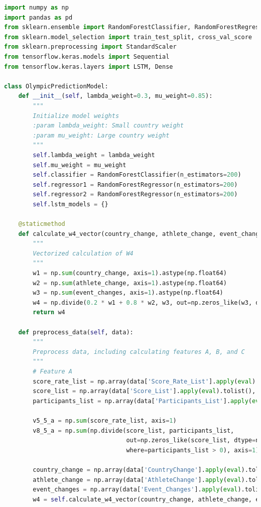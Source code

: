 \documentclass[12pt]{article}
\begin{document}
\begin{lstlisting}[language=Python, style=mystyle, caption=model.ipynb]
import numpy as np
import pandas as pd
from sklearn.ensemble import RandomForestClassifier, RandomForestRegressor
from sklearn.model_selection import train_test_split, cross_val_score
from sklearn.preprocessing import StandardScaler
from tensorflow.keras.models import Sequential
from tensorflow.keras.layers import LSTM, Dense

class OlympicPredictionModel:
    def __init__(self, lambda_weight=0.3, mu_weight=0.85):
        """
        Initialize model weights
        :param lambda_weight: Small country weight
        :param mu_weight: Large country weight
        """
        self.lambda_weight = lambda_weight
        self.mu_weight = mu_weight
        self.classifier = RandomForestClassifier(n_estimators=200)
        self.regressor1 = RandomForestRegressor(n_estimators=200)
        self.regressor2 = RandomForestRegressor(n_estimators=200)
        self.lstm_models = {}

    @staticmethod
    def calculate_w4_vector(country_change, athlete_change, event_changes):
        """
        Vectorized calculation of W4
        """
        w1 = np.sum(country_change, axis=1).astype(np.float64)
        w2 = np.sum(athlete_change, axis=1).astype(np.float64)
        w3 = np.sum(event_changes, axis=1).astype(np.float64)
        w4 = np.divide(0.2 * w1 + 0.8 * w2, w3, out=np.zeros_like(w3, dtype=np.float64), where=w3 != 0)
        return w4

    def preprocess_data(self, data):
        """
        Preprocess data, including calculating features A, B, and C
        """
        # Feature A
        score_rate_list = np.array(data['Score_Rate_List'].apply(eval).tolist())
        score_list = np.array(data['Score_List'].apply(eval).tolist(), dtype=np.float64)
        participants_list = np.array(data['Participants_List'].apply(eval).tolist(), dtype=np.float64)

        v5_5_a = np.sum(score_rate_list, axis=1)
        v8_5_a = np.sum(np.divide(score_list, participants_list, 
                                  out=np.zeros_like(score_list, dtype=np.float64), 
                                  where=participants_list > 0), axis=1)

        country_change = np.array(data['CountryChange'].apply(eval).tolist())
        athlete_change = np.array(data['AthleteChange'].apply(eval).tolist())
        event_changes = np.array(data['Event_Changes'].apply(eval).tolist())
        w4 = self.calculate_w4_vector(country_change, athlete_change, event_changes)


\end{lstlisting}
\end{document}
